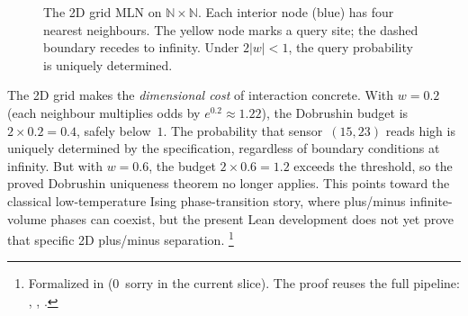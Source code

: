 \documentclass[11pt,openany]{report}
\begin{document}
\begin{figure}[htbp]
\centering
{}
\caption{The 2D grid MLN on $\mathbb{N}\times\mathbb{N}$.  Each interior
  node (blue) has four nearest neighbours.  The yellow node marks a query
  site; the dashed boundary recedes to infinity.  Under $2|w|<1$, the
  query probability is uniquely determined.}
\label{fig:grid-mln}
\end{figure}

\noindent
The 2D grid makes the \emph{dimensional cost} of interaction concrete.  With
$w = 0.2$ (each neighbour multiplies odds by $e^{0.2}\approx 1.22$), the
Dobrushin budget is $2\times 0.2 = 0.4$, safely below~$1$.  The probability
that sensor~$(15,23)$ reads high is uniquely determined by the specification,
regardless of boundary conditions at infinity.  But with $w = 0.6$, the budget
$2\times 0.6 = 1.2$ exceeds the threshold, so the proved Dobrushin uniqueness
theorem no longer applies. This points toward the classical low-temperature
Ising phase-transition story, where plus/minus infinite-volume phases can
coexist, but the present Lean development does not yet prove that specific 2D
plus/minus separation.%
\footnote{Formalized in
(0~sorry in the current slice).  The proof reuses the full pipeline:
,
,
.}
\end{document}
